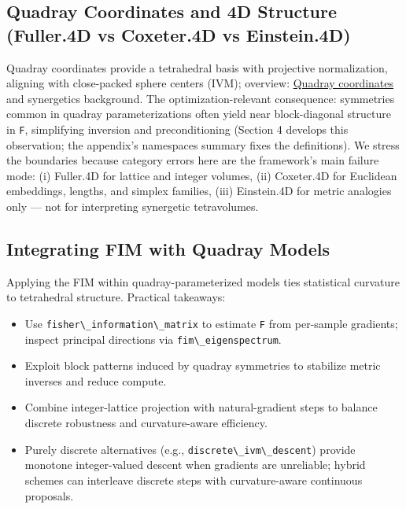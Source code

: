 \documentclass[
  10pt,
]{article}
\newcommand{\passthrough}[1]{#1}
\providecommand{\tightlist}{%
  \setlength{\itemsep}{0pt}\setlength{\parskip}{0pt}}
\begin{document}
\subsection{Quadray Coordinates and 4D Structure (Fuller.4D vs
Coxeter.4D vs
Einstein.4D)}\label{quadray-coordinates-and-4d-structure-fuller.4d-vs-coxeter.4d-vs-einstein.4d}

Quadray coordinates provide a tetrahedral basis with projective
normalization, aligning with close-packed sphere centers (IVM);
overview:
\href{https://en.wikipedia.org/wiki/Quadray_coordinates}{Quadray
coordinates} and synergetics background. The optimization-relevant
consequence: symmetries common in quadray parameterizations often yield
near block-diagonal structure in \passthrough{\lstinline!F!},
simplifying inversion and preconditioning (Section 4 develops this
observation; the appendix's namespaces summary fixes the definitions).
We stress the boundaries because category errors here are the
framework's main failure mode: (i) Fuller.4D for lattice and integer
volumes, (ii) Coxeter.4D for Euclidean embeddings, lengths, and simplex
families, (iii) Einstein.4D for metric analogies only --- not for
interpreting synergetic tetravolumes.

\subsection{Integrating FIM with Quadray
Models}\label{integrating-fim-with-quadray-models}

Applying the FIM within quadray-parameterized models ties statistical
curvature to tetrahedral structure. Practical takeaways:

\begin{itemize}
\tightlist
\item
  Use \passthrough{\lstinline!fisher\_information\_matrix!} to estimate
  \passthrough{\lstinline!F!} from per-sample gradients; inspect
  principal directions via \passthrough{\lstinline!fim\_eigenspectrum!}.
\item
  Exploit block patterns induced by quadray symmetries to stabilize
  metric inverses and reduce compute.
\item
  Combine integer-lattice projection with natural-gradient steps to
  balance discrete robustness and curvature-aware efficiency.
\item
  Purely discrete alternatives (e.g.,
  \passthrough{\lstinline!discrete\_ivm\_descent!}) provide monotone
  integer-valued descent when gradients are unreliable; hybrid schemes
  can interleave discrete steps with curvature-aware continuous
  proposals.
\end{itemize}
\end{document}
